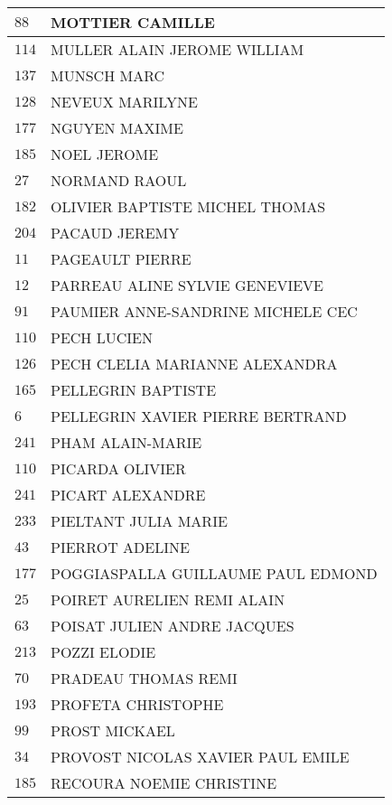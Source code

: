 \begin{xltabular}{\linewidth}{|l|X|}
    \hline
    $88$ & MOTTIER CAMILLE \\
    \hline
    $114$ & MULLER ALAIN JEROME WILLIAM \\
    \hline
    $137$ & MUNSCH MARC \\
    \hline
    $128$ & NEVEUX MARILYNE \\
    \hline
    $177$ & NGUYEN MAXIME \\
    \hline
    $185$ & NOEL JEROME \\
    \hline
    $27$ & NORMAND RAOUL \\
    \hline
    $182$ & OLIVIER BAPTISTE MICHEL THOMAS \\
    \hline
    $204$ & PACAUD JEREMY \\
    \hline
    $11$ & PAGEAULT PIERRE \\
    \hline
    $12$ & PARREAU ALINE SYLVIE GENEVIEVE \\
    \hline
    $91$ & PAUMIER ANNE-SANDRINE MICHELE CEC \\
    \hline
    $110$ & PECH LUCIEN \\
    \hline
    $126$ & PECH CLELIA MARIANNE ALEXANDRA \\
    \hline
    $165$ & PELLEGRIN BAPTISTE \\
    \hline
    $6$ & PELLEGRIN XAVIER PIERRE BERTRAND \\
    \hline
    $241$ & PHAM ALAIN-MARIE \\
    \hline
    $110$ & PICARDA OLIVIER \\
    \hline
    $241$ & PICART ALEXANDRE \\
    \hline
    $233$ & PIELTANT JULIA MARIE \\
    \hline
    $43$ & PIERROT ADELINE \\
    \hline
    $177$ & POGGIASPALLA GUILLAUME PAUL EDMOND \\
    \hline
    $25$ & POIRET AURELIEN REMI ALAIN \\
    \hline
    $63$ & POISAT JULIEN ANDRE JACQUES \\
    \hline
    $213$ & POZZI ELODIE \\
    \hline
    $70$ & PRADEAU THOMAS REMI \\
    \hline
    $193$ & PROFETA CHRISTOPHE \\
    \hline
    $99$ & PROST MICKAEL \\
    \hline
    $34$ & PROVOST NICOLAS XAVIER PAUL EMILE \\
    \hline
    $185$ & RECOURA NOEMIE CHRISTINE \\

\end{xltabular}
